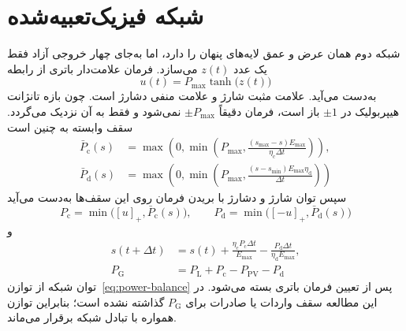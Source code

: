 \section{شبکه فیزیک‌تعبیه‌شده}
شبکه دوم همان عرض و عمق لایه‌های پنهان را دارد، اما به‌جای چهار خروجی آزاد فقط یک عدد $z(t)$ می‌سازد. فرمان علامت‌دار باتری از رابطه
\begin{equation}
  u(t)=P_{\max}\tanh\bigl(z(t)\bigr)
  \label{eq:signed-command}
\end{equation}
به‌دست می‌آید. علامت مثبت شارژ و علامت منفی دشارژ است. چون بازه تانژانت هیپربولیک در $\pm 1$ باز است، فرمان دقیقاً $\pm P_{\max}$ نمی‌شود و فقط به آن نزدیک می‌گردد. سقف وابسته به  چنین است
\begin{equation}
\begin{aligned}
  \bar{P}_{\mathrm{c}}(s)&=\max\left(0,\min\left(P_{\max},\frac{(s_{\max}-s)E_{\max}}{\eta_{\mathrm{c}}\Delta t}\right)\right),\\
  \bar{P}_{\mathrm{d}}(s)&=\max\left(0,\min\left(P_{\max},\frac{(s-s_{\min})E_{\max}\eta_{\mathrm{d}}}{\Delta t}\right)\right)
\end{aligned}
  \label{eq:soc-caps}
\end{equation}
سپس توان شارژ و دشارژ با بریدن فرمان روی این سقف‌ها به‌دست می‌آید
\begin{equation}
  P_{\mathrm{c}}=\min\bigl([u]_{+},\bar{P}_{\mathrm{c}}(s)\bigr),\qquad
  P_{\mathrm{d}}=\min\bigl([-u]_{+},\bar{P}_{\mathrm{d}}(s)\bigr)
  \label{eq:hard-powers}
\end{equation}
و
\begin{equation}
\begin{aligned}
  s(t+\Delta t)&=s(t)+\frac{\eta_{\mathrm{c}}P_{\mathrm{c}}\Delta t}{E_{\max}}-\frac{P_{\mathrm{d}}\Delta t}{\eta_{\mathrm{d}}E_{\max}},\\
  P_{\mathrm{G}}&=P_{\mathrm{L}}+P_{\mathrm{c}}-P_{\mathrm{PV}}-P_{\mathrm{d}}
\end{aligned}
  \label{eq:hard-soc}
\end{equation}
توان شبکه از توازن~\eqref{eq:power-balance} پس از تعیین فرمان باتری بسته می‌شود. در این مطالعه سقف واردات یا صادرات برای $P_{\mathrm{G}}$ گذاشته نشده است؛ بنابراین توازن همواره با تبادل شبکه برقرار می‌ماند.

